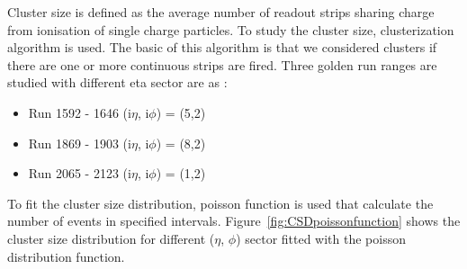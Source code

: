 Cluster size is defined as the average number of readout strips sharing charge from ionisation of single charge particles.
To study the cluster size, clusterization algorithm is used. The basic of this algorithm is that we considered clusters if there are one or more continuous strips are fired. Three golden run ranges are studied with different eta sector are as :\\
\begin{itemize}
\item{Run 1592 - 1646 (i$\eta$, i$\phi$) = (5,2)}
\item{Run 1869 - 1903 (i$\eta$, i$\phi$) = (8,2)}
\item{Run 2065 - 2123 (i$\eta$, i$\phi$) = (1,2)}
\end{itemize}
To fit the cluster size distribution, poisson function is used that calculate the number of events in specified intervals. Figure~\ref{fig:CSDpoissonfunction} shows the cluster size distribution for different ($\eta$, $\phi$) sector fitted with the poisson distribution function.

